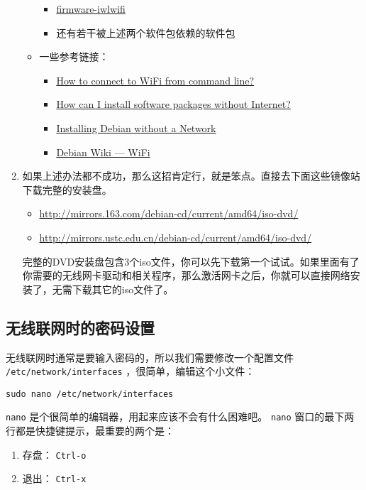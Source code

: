 \documentclass{wx672ctexart}
\begin{document}
\begin{enumerate}
\begin{itemize}
\begin{itemize}
\item \href{https://packages.debian.org/buster/firmware-iwlwifi}{firmware-iwlwifi}
\item 还有若干被上述两个软件包依赖的软件包
\end{itemize}
\item 一些参考链接：
\begin{itemize}
\item \href{https://unix.stackexchange.com/questions/283722/how-to-connect-to-wifi-from-command-line}{How to connect to WiFi from command line?}
\item \href{https://askubuntu.com/questions/974/how-can-i-install-software-or-packages-without-internet-offline}{How can I install software packages without Internet?}
\item \href{https://commandlinefanatic.com/cgi-bin/showarticle.cgi?article=art016}{Installing Debian without a Network}
\item \href{https://wiki.debian.org/WiFi}{Debian Wiki --- WiFi}
\end{itemize}
\end{itemize}
\item 如果上述办法都不成功，那么这招肯定行，就是笨点。直接去下面这些镜像站下载完整的安装盘。
\begin{itemize}
\item \url{http://mirrors.163.com/debian-cd/current/amd64/iso-dvd/}
\item \url{http://mirrors.ustc.edu.cn/debian-cd/current/amd64/iso-dvd/}
\end{itemize}

完整的DVD安装盘包含3个iso文件，你可以先下载第一个试试。如果里面有了你需要的无线网卡驱动和相关程序，那么激活网卡之后，你就可以直接网络安装了，无需下载其它的iso文件了。
\end{enumerate}

\subsection{无线联网时的密码设置}
\label{sec:orgc0a8978}
无线联网时通常是要输入密码的，所以我们需要修改一个配置文件 \texttt{/etc/network/interfaces} ，很简单，编辑这个小文件：
\begin{verbatim}
sudo nano /etc/network/interfaces
\end{verbatim}
\texttt{nano} 是个很简单的编辑器，用起来应该不会有什么困难吧。 
\texttt{nano} 窗口的最下两行都是快捷键提示，最重要的两个是：
\begin{enumerate}
\item 存盘： \texttt{Ctrl-o}
\item 退出： \texttt{Ctrl-x}
\end{enumerate}
\end{document}
